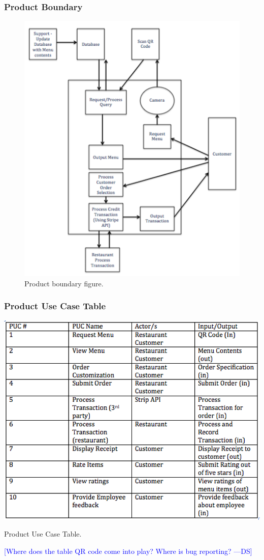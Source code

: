 \documentclass[12pt, titlepage]{article}
\newcommand{\authornote}[3]{\textcolor{#1}{[#3 ---#2]}}
\newcommand{\authornote}[3]{}
\newcommand{\ds}[1]{\authornote{blue}{DS}{#1}}
\begin{document}
\subsubsection{Product Boundary}
\begin{figure}[H]
\includegraphics{ProductBoundary.png}
\caption{Product boundary figure.}
\end{figure}

\subsubsection{Product Use Case Table}
\begin{table}[H]
  \centering
\includegraphics{PUC.png}
\caption{Product Use Case Table.}
\end{table}
\ds{Where does the table QR code come into play? Where is bug reporting?}
\end{document}
